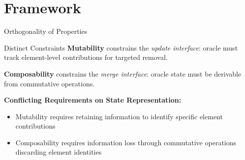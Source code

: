 \documentclass{beamer}
\begin{document}










\section{Framework}

\begin{frame}{Orthogonality of Properties}

    \begin{block}{Distinct Constraints}
        \textbf{Mutability} constrains the \emph{update interface}:
        oracle must track element-level contributions for targeted removal.

        \textbf{Composability} constrains the \emph{merge interface}:
        oracle state must be derivable from commutative operations.
    \end{block}

    \vspace{0.5em}

    \textbf{Conflicting Requirements on State Representation:}

    \begin{itemize}
        \item Mutability requires retaining information to identify
              specific element contributions
        \item Composability requires information loss through
              commutative operations discarding element identities
    \end{itemize}

\end{frame}
\end{document}
